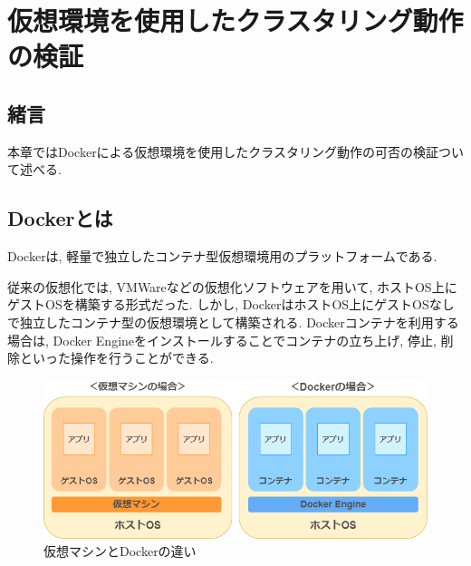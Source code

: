 \chapter{仮想環境を使用したクラスタリング動作の検証}
\label{chap:fourth}

\section{緒言}
本章ではDockerによる仮想環境を使用したクラスタリング動作の可否の検証ついて述べる.





\section{Dockerとは}
Dockerは, 軽量で独立したコンテナ型仮想環境用のプラットフォームである.

従来の仮想化では, VMWareなどの仮想化ソフトウェアを用いて, ホストOS上にゲストOSを構築する形式だった.
しかし, DockerはホストOS上にゲストOSなしで独立したコンテナ型の仮想環境として構築される.
Dockerコンテナを利用する場合は, Docker Engineをインストールすることでコンテナの立ち上げ, 停止, 削除といった操作を行うことができる.

\begin{figure}[H]
  \begin{center}
    \includegraphics[width=120mm]{sotu/figure/docker-vmware.png}
    \caption{仮想マシンとDockerの違い \cite{4}}
    \label{4-p1}
  \end{center}
\end{figure}

